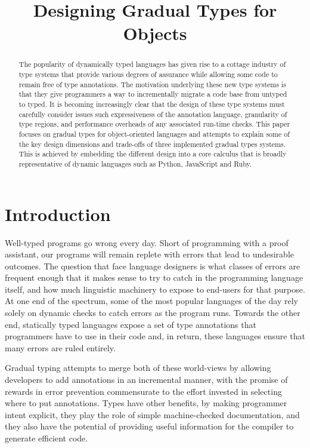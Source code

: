 \documentclass[preprint]{sigplanconf}
\begin{document}
\title{Designing Gradual Types for Objects
\vspace{-1cm}} 
\authorinfo{}{}{} %
\maketitle

\begin{abstract}
The popularity of dynamically typed languages has given rise to a cottage
industry of type systems that provide various degrees of assurance
while allowing some code to remain free of type annotations. 
The motivation underlying these new type systems is that they give
programmers a way to incrementally migrate a code base from untyped
to typed.  It is becoming increasingly clear that the design of these
type systems must carefully consider issues such expressiveness of the 
annotation language, granularity of type regions, and performance overheads
of any associated run-time checks.  This paper focuses on gradual types for 
object-oriented languages and attempts to explain some of the key design 
dimensions and trade-offs of three implemented gradual types systems.
This is achieved by embedding the different design into a core calculus
that is broadly representative of dynamic languages such as Python, JavaScript
and Ruby.
\end{abstract} 

\section{Introduction}
Well-typed programs go wrong every day. Short of programming with a proof
assistant, our programs will remain replete with errors that lead to
undesirable outcomes.  The question that face language designers is what
classes of errors are frequent enough that it makes sense to try to catch in
the programming language itself, and how much linguistic machinery to expose
to end-users for that purpose.  At one end of the spectrum, some of the most
popular languages of the day rely solely on dynamic checks to catch errors
as the program runs. Towards the other end, statically typed languages
expose a set of type annotations that programmers have to use in their code
and, in return, these languages ensure that many errors are ruled entirely.

Gradual typing attempts to merge both of these world-views by allowing
developers to add annotations in an incremental manner, with the promise of
rewards in error prevention commensurate to the effort invested in selecting
where to put annotations. Types have other benefits, by making programmer
intent explicit, they play the role of simple machine-checked documentation,
and they also have the potential of providing useful information for
the compiler to generate efficient code.
\end{document}
